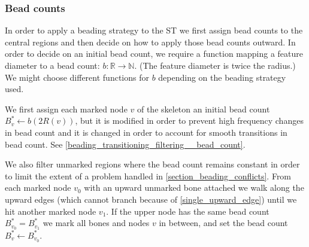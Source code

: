 \subsubsection{Bead counts}
In order to apply a beading strategy to the ST we first assign bead counts to the central regions and then decide on how to apply those bead counts outward.
In order to decide on an initial bead count, we require a function mapping a feature diameter to a bead count: $b: \mathbb{R} \to \mathbb{N}$.
(The feature diameter is twice the radius.)
We might choose different functions for $b$ depending on the beading strategy used.

We first assign each marked node $v$ of the skeleton an initial bead count $B^*_v \leftarrow b(2R(v))$, but it is modified in order to prevent high frequency changes in bead count and it is changed in order to account for smooth transitions in bead count.
See \cref{beading_transitioning_filtering__bead_count}.

We also filter unmarked regions where the bead count remains constant in order to limit the extent of a problem handled in \cref{section_beading_conflicts}.
From each marked node $v_0$ with an upward unmarked bone attached we walk along the upward edges (which cannot branch because of \cref{single_upward_edge}) until we hit another marked node $v_1$.
If the upper node has the same bead count $B^*_{v_0} = B^*_{v_1}$ we mark all bones and nodes $v$ in between, and set the bead count $B^*_v \leftarrow B^*_{v_0}$.



